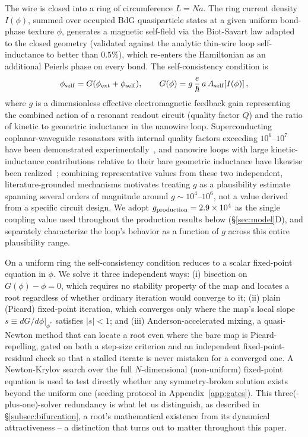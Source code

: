 \documentclass[aps,physrev,reprint,superscriptaddress,amsmath,amssymb,floatfix]{revtex4-2}
\begin{document}
The wire is closed into a ring of circumference $L=Na$. The ring current
density $I(\phi)$, summed over occupied BdG quasiparticle states at a
given uniform bond-phase texture $\phi$, generates a magnetic self-field
via the Biot-Savart law adapted to the closed geometry (validated
against the analytic thin-wire loop self-inductance to better than
$0.5\%$), which re-enters the Hamiltonian as an additional Peierls phase
on every bond. The self-consistency condition is
\begin{equation}
\phi_{\rm self} = G(\phi_{\rm ext}+\phi_{\rm self}), \qquad
G(\phi) = g\,\frac{e}{\hbar}\,a\,A_{\rm self}\!\left[I(\phi)\right],
\end{equation}
where $g$ is a dimensionless effective electromagnetic feedback gain
representing the combined action of a resonant readout circuit (quality
factor $Q$) and the ratio of kinetic to geometric inductance in the
nanowire loop. Superconducting coplanar-waveguide resonators with
internal quality factors exceeding $10^6$--$10^7$ have been demonstrated
experimentally~\cite{megrant2012}, and nanowire loops with large
kinetic-inductance contributions relative to their bare geometric
inductance have likewise been realized~\cite{samkharadze2016}; combining
representative values from these two independent, literature-grounded
mechanisms motivates treating $g$ as a plausibility estimate spanning
several orders of magnitude around $g\sim10^4$--$10^6$, not a value
derived from a specific circuit design. We adopt $g_{\rm
production}=2.9\times10^4$ as the single coupling value used throughout
the production results below (\S\ref{sec:model}D), and separately
characterize the loop's behavior as a function of $g$ across this entire
plausibility range.

On a uniform ring the self-consistency condition reduces to a scalar
fixed-point equation in $\phi$. We solve it three independent ways: (i)
bisection on $G(\phi)-\phi=0$, which requires no stability property of
the map and locates a root regardless of whether ordinary iteration would
converge to it; (ii) plain (Picard) fixed-point iteration, which
converges only where the map's local slope $s\equiv
dG/d\phi|_{\phi^*}$ satisfies $|s|<1$; and (iii) Anderson-accelerated
mixing, a quasi-Newton method that can locate a root even where the bare
map is Picard-repelling, gated on both a step-size criterion and an
independent fixed-point-residual check so that a stalled iterate is never
mistaken for a converged one. A Newton-Krylov search over the full
$N$-dimensional (non-uniform) fixed-point equation is used to test
directly whether any symmetry-broken solution exists beyond the uniform
one (seeding protocol in Appendix~\ref{app:gates}). This
three(-plus-one)-solver redundancy is what let us distinguish, as
described in \S\ref{subsec:bifurcation}, a root's mathematical existence from
its dynamical attractiveness -- a distinction that turns out to matter
throughout this paper.
\end{document}
